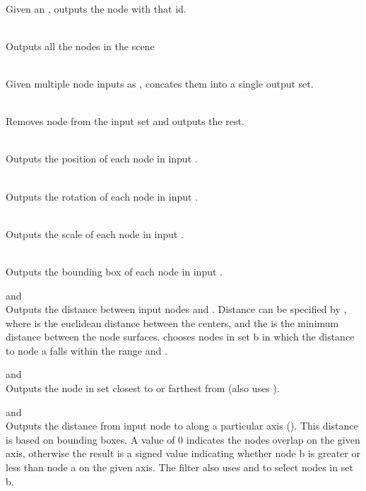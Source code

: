 \begin{description}
	\item{} \\
		Given an , outputs the node with that id.
	\item{} \\
		Outputs all the nodes in the scene
	\item{} \\
		Given multiple node inputs as , concates them into a single output set.
	\item{} \\
		Removes node  from the input set  and outputs the rest. 
	\item{} \\
		Outputs the position of each node in input .
	\item{} \\
		Outputs the rotation of each node in input .
	\item{} \\
		Outputs the scale of each node in input .
	\item{} \\
		Outputs the bounding box of each node in input .
	\item{ and } \\
		Outputs the distance between input nodes  and . Distance can be specified by , where  is the euclidean distance between the centers, and the  is the minimum distance between the node surfaces.  chooses nodes in set b in which the distance to node a falls within the range  and .
	\item{ and } \\
		Outputs the node in set  closest to or farthest from  (also uses ).
	\item{ and } \\
		Outputs the distance from input node  to  along a particular axis (). This distance is based on bounding boxes. A value of 0 indicates the nodes overlap on the given axis, otherwise the result is a signed value indicating whether node b is greater or less than node a on the given axis. The  filter also uses  and  to select nodes in set b. 

\end{description}

